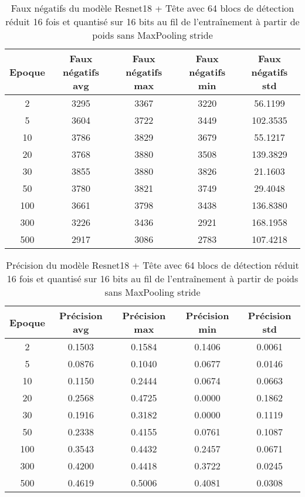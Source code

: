 \begin{table}[!ht]
    \caption{Faux négatifs du modèle Resnet18 + Tête avec 64 blocs de détection réduit 16 fois et quantisé sur 16 bits au fil de l'entraînement à partir de poids sans MaxPooling stride}
    \label{tab:qresnet18+head_64n_reduced_16x_false_negative_16b_from_weights_wo_maxpool_stride}
    \centering
    \begin{tabular}{ |c||c|c|c|c|  }
        \hline
        \rowcolor{gray!50}
        Epoque & Faux négatifs avg & Faux négatifs max & Faux négatifs min & Faux négatifs std\\
        \hline
        2 & 3295 & 3367 & 3220 & 56.1199\\
        5 & 3604 & 3722 & 3449 & 102.3535\\
        10 & 3786 & 3829 & 3679 & 55.1217\\
        20 & 3768 & 3880 & 3508 & 139.3829\\
        30 & 3855 & 3880 & 3826 & 21.1603\\
        50 & 3780 & 3821 & 3749 & 29.4048\\
        100 & 3661 & 3798 & 3438 & 136.8380\\
        300 & 3226 & 3436 & 2921 & 168.1958\\
        500 & 2917 & 3086 & 2783 & 107.4218\\
        \hline
    \end{tabular}
\end{table}

\begin{table}[!ht]
    \caption{Précision du modèle Resnet18 + Tête avec 64 blocs de détection réduit 16 fois et quantisé sur 16 bits au fil de l'entraînement à partir de poids sans MaxPooling stride}
    \label{tab:qresnet18+head_64n_reduced_16x_precision_16b_from_weights_wo_maxpool_stride}
    \centering
    \begin{tabular}{ |c||c|c|c|c|  }
        \hline
        \rowcolor{gray!50}
        Epoque & Précision avg & Précision max & Précision min & Précision std\\
        \hline
        2 & 0.1503 & 0.1584 & 0.1406 & 0.0061\\
        5 & 0.0876 & 0.1040 & 0.0677 & 0.0146\\
        10 & 0.1150 & 0.2444 & 0.0674 & 0.0663\\
        20 & 0.2568 & 0.4725 & 0.0000 & 0.1862\\
        30 & 0.1916 & 0.3182 & 0.0000 & 0.1119\\
        50 & 0.2338 & 0.4155 & 0.0761 & 0.1087\\
        100 & 0.3543 & 0.4432 & 0.2457 & 0.0671\\
        300 & 0.4200 & 0.4418 & 0.3722 & 0.0245\\
        500 & 0.4619 & 0.5006 & 0.4081 & 0.0308\\
        \hline
    \end{tabular}
\end{table}

